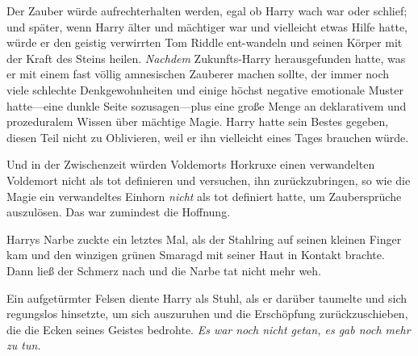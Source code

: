 Der Zauber würde aufrechterhalten werden, egal ob Harry wach war oder schlief; und später, wenn Harry älter und mächtiger war und vielleicht etwas Hilfe hatte, würde er den geistig verwirrten Tom Riddle ent-wandeln und seinen Körper mit der Kraft des Steins heilen. \emph{Nachdem} Zukunfts-Harry herausgefunden hatte, was er mit einem fast völlig amnesischen Zauberer machen sollte, der immer noch viele schlechte Denkgewohnheiten und einige höchst negative emotionale Muster hatte—eine dunkle Seite sozusagen—plus eine große Menge an deklarativem und prozeduralem Wissen über mächtige Magie. Harry hatte sein Bestes gegeben, diesen Teil nicht zu Oblivieren, weil er ihn vielleicht eines Tages brauchen würde.

Und in der Zwischenzeit würden Voldemorts Horkruxe einen verwandelten Voldemort nicht als tot definieren und versuchen, ihn zurückzubringen, so wie die Magie ein verwandeltes Einhorn \emph{nicht} als tot definiert hatte, um Zaubersprüche auszulösen. Das war zumindest die Hoffnung.

Harrys Narbe zuckte ein letztes Mal, als der Stahlring auf seinen kleinen Finger kam und den winzigen grünen Smaragd mit seiner Haut in Kontakt brachte. Dann ließ der Schmerz nach und die Narbe tat nicht mehr weh.

Ein aufgetürmter Felsen diente Harry als Stuhl, als er darüber taumelte und sich regungslos hinsetzte, um sich auszuruhen und die Erschöpfung zurückzuschieben, die die Ecken seines Geistes bedrohte. \emph{Es war noch nicht getan, es gab noch mehr zu tun.}

